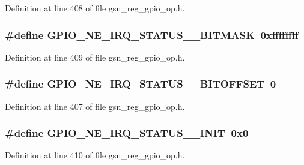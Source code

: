 Definition at line 408 of file gsn\_\-reg\_\-gpio\_\-op.h.

\hypertarget{a00553_acc88b7f302144af7604ed27bfe1c4ce8}{
\subsubsection[{GPIO\_\-NE\_\-IRQ\_\-STATUS\_\-1\_\-BITMASK}]{\setlength{\rightskip}{0pt plus 5cm}\#define GPIO\_\-NE\_\-IRQ\_\-STATUS\_\_\-BITMASK~0xffffffff}}
\label{a00553_acc88b7f302144af7604ed27bfe1c4ce8}


Definition at line 409 of file gsn\_\-reg\_\-gpio\_\-op.h.

\hypertarget{a00553_a3c16a77dc16cc958c15824fb5d397b96}{
\subsubsection[{GPIO\_\-NE\_\-IRQ\_\-STATUS\_\-1\_\-BITOFFSET}]{\setlength{\rightskip}{0pt plus 5cm}\#define GPIO\_\-NE\_\-IRQ\_\-STATUS\_\_\-BITOFFSET~0}}
\label{a00553_a3c16a77dc16cc958c15824fb5d397b96}


Definition at line 407 of file gsn\_\-reg\_\-gpio\_\-op.h.

\hypertarget{a00553_a92db188dcc84c9bdd5b3e714ed400534}{
\subsubsection[{GPIO\_\-NE\_\-IRQ\_\-STATUS\_\-1\_\-INIT}]{\setlength{\rightskip}{0pt plus 5cm}\#define GPIO\_\-NE\_\-IRQ\_\-STATUS\_\_\-INIT~0x0}}
\label{a00553_a92db188dcc84c9bdd5b3e714ed400534}


Definition at line 410 of file gsn\_\-reg\_\-gpio\_\-op.h.

